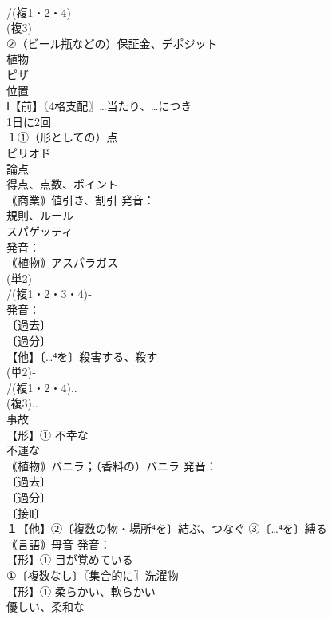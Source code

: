\documentclass[8pt]{extreport}
\begin{document}
\begin{CJK}{UTF8}{min}
\\	/(複1・2・4)
\\	(複3)
\\	②（ビール瓶などの）保証金、デポジット 
\\	植物 
\\	ピザ 
\\	位置
\\	Ⅰ【前】〖4格支配〗…当たり、…につき
\\	1日に2回
\\	１①（形としての）点 
\\	ピリオド 
\\	論点　
\\	得点、点数、ポイント
\\	｟商業｠値引き、割引 発音：
\\	規則、ルール 
\\	スパゲッティ 
\\	発音：
\\	｟植物｠アスパラガス 
\\	(単2)‐
\\	/(複1・2・3・4)‐
\\	[まれに(複1)‐
\\	①（活動などの）開始
\\	声
\\	①〔複数なし〕大学での勉強 
\\	スープ 
\\	料金〈運賃〉[表] 発音：
\\	〔過去〕
\\	〔過分〕
\\	【他】〔…⁴を〕殺害する、殺す 
\\	(単2)‐
\\	/(複1・2・4)..
\\	(複3)..
\\	事故 
\\	【形】① 不幸な　
\\	不運な
\\	｟植物｠バニラ；（香料の）バニラ 発音：
\\	〔過去〕
\\	〔過分〕
\\	〔接Ⅱ〕
\\	１【他】②〔複数の物・場所⁴を〕結ぶ、つなぐ ③〔…⁴を〕縛る
\\	｟言語｠母音 発音：
\\	【形】① 目が覚めている 
\\	①〔複数なし〕〖集合的に〗洗濯物 
\\	【形】① 柔らかい、軟らかい 
\\	優しい、柔和な 

\end{CJK}
\end{document}
